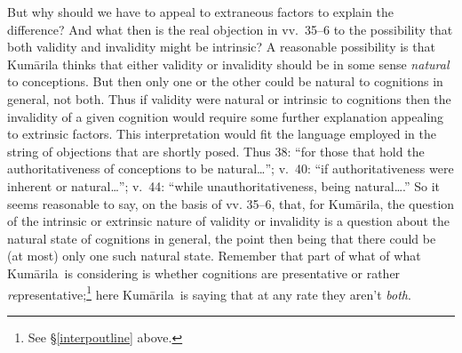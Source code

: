 \documentclass[11pt,letterpaper,oneside]{amsart}
\newcommand{\e}{\emph}
\newcommand{\kum}{Kum\={a}rila}
\begin{document}
But why should we have to appeal to extraneous factors to explain the difference? And what then is the real objection in vv.\ 35--6 to the possibility that both validity and invalidity might be intrinsic? A reasonable possibility is that Kum\=arila thinks that either validity or invalidity should be in some sense \emph{natural} to conceptions. But then only one or the other could be natural to cognitions in general, not both. Thus if validity were natural or intrinsic to cognitions then the invalidity of a given cognition would require some further explanation appealing to extrinsic factors. This interpretation would fit the language employed in the string of objections that are shortly posed. Thus 38: ``for those that hold the authoritativeness of conceptions to be natural\ldots''; v.\ 40:  ``if authoritativeness were inherent or natural\ldots''; v.\ 44: ``while unauthoritativeness, being natural\ldots .'' So it seems reasonable to say, on the basis of vv. 35--6, that, for Kum\=arila, the question of the intrinsic or extrinsic nature of validity or invalidity is a question about the natural state of cognitions in general, the point then being that there could be (at most) only one such natural state. Remember that part of what of what \kum\ is considering is whether cognitions are presentative or rather \emph{re}presentative;\footnote{See \S\ref{interpoutline} above.} here \kum\ is saying that at any rate they aren't \e{both}.
\end{document}
